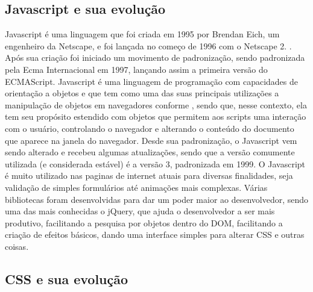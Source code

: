 \subsection{Javascript e sua evolução}

Javascript é uma linguagem que foi criada em 1995 por Brendan Eich,
um engenheiro da Netscape, e foi lançada no começo de 1996 com o
Netscape 2. \cite{mdnjavascript}. Após sua criação foi iniciado um
movimento de padronização, sendo padronizada pela Ecma
Internacional em 1997, lançando assim a primeira versão do ECMAScript.
Javascript é uma linguagem de programação com capacidades de orientação a objetos e que tem como uma das suas principais
utilizações a manipulação de objetos em navegadores conforme
, sendo que, nesse contexto,
ela tem seu propósito estendido com objetos que permitem aos scripts uma interação com o usuário,
controlando o navegador e alterando o conteúdo do documento que aparece na janela do navegador.
Desde sua padronização, o Javascript vem sendo alterado e
recebeu algumas atualizações, sendo que a versão comumente
utilizada (e considerada estável) é a versão 3, padronizada em 1999.
O Javascript é muito utilizado nas paginas de internet atuais para
diversas finalidades, seja validação de simples formulários até
animações mais complexas. Várias bibliotecas foram desenvolvidas para
dar um poder maior ao desenvolvedor, sendo uma das mais conhecidas o
jQuery, que ajuda o desenvolvedor a ser mais produtivo, facilitando a
pesquisa por objetos dentro do DOM, facilitando a criação de efeitos
básicos, dando uma interface simples para alterar CSS e outras coisas.

\subsection{CSS e sua evolução}

